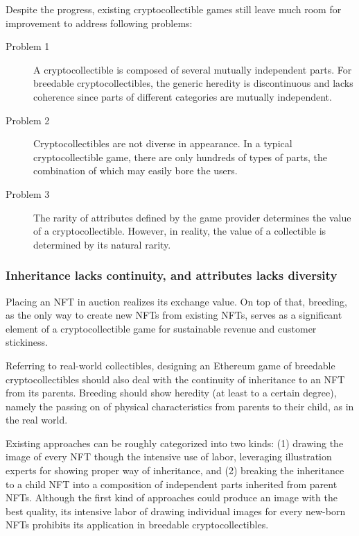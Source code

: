\documentclass[a4paper]{article}
\begin{document}
Despite the progress, existing cryptocollectible games still leave much room for improvement to address following problems:

\begin{description}
\item [Problem 1\label{problem:1}] A cryptocollectible is composed of several mutually independent parts. For breedable cryptocollectibles, the generic heredity is discontinuous and lacks coherence since parts of different categories are mutually independent.
\item [Problem 2\label{problem:2}] Cryptocollectibles are not diverse in appearance. In a typical cryptocollectible game, there are only hundreds of types of parts, the combination of which may easily bore the users.
\item [Problem 3\label{problem:3}] The rarity of attributes defined by the game provider determines the value of a cryptocollectible. However, in reality, the value of a collectible is determined by its natural rarity.
\end{description}

\subsubsection{Inheritance lacks continuity, and attributes lacks diversity}

Placing an NFT in auction realizes its exchange value. 
On top of that, breeding, as the only way to create new NFTs from existing NFTs, 
serves as a significant element of a cryptocollectible game for sustainable revenue and customer stickiness.

Referring to real-world collectibles, designing an Ethereum game of breedable cryptocollectibles should also deal with the continuity of inheritance to an NFT from its parents. 
Breeding should show heredity (at least to a certain degree), namely the passing on of physical characteristics from parents to their child, as in the real world.

Existing approaches can be roughly categorized into two kinds: 
(1) drawing the image of every NFT though the intensive use of labor, leveraging illustration experts for showing proper way of inheritance, and 
(2) breaking the inheritance to a child NFT into a composition of independent parts inherited from parent NFTs. 
Although the first kind of approaches could produce an image with the best quality, its intensive labor of drawing individual images for every new-born NFTs prohibits its application in breedable cryptocollectibles.
\end{document}
